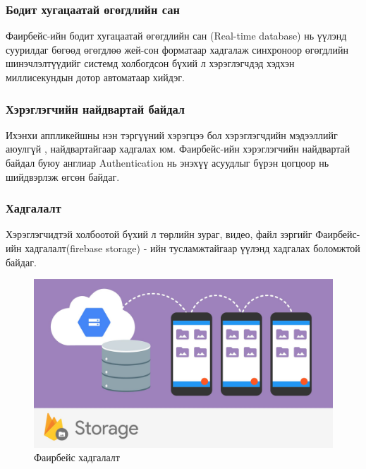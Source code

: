 \subsubsection{Бодит хугацаатай өгөгдлийн сан}
Фаирбейс-ийн бодит хугацаатай өгөгдлийн сан (Real-time database) нь үүлэнд суурилдаг бөгөөд өгөгдлөө жей-сон форматаар хадгалаж синхроноор өгөгдлийн шинэчлэлтүүдийг системд холбогдсон бүхий л хэрэглэгчдэд хэдхэн миллисекундын дотор автоматаар хийдэг. 

\subsubsection{Хэрэглэгчийн найдвартай байдал}
Ихэнхи аппликейшны нэн тэргүүний хэрэгцээ бол хэрэглэгчдийн мэдээллийг аюулгүй , найдвартайгаар хадгалах юм. Фаирбейс-ийн хэрэглэгчийн найдвартай байдал буюу англиар Authentication нь энэхүү асуудлыг бүрэн цогцоор нь шийдвэрлэж өгсөн байдаг.

\subsubsection{Хадгалалт}
Хэрэглэгчидтэй холбоотой бүхий л төрлийн зураг, видео, файл зэргийг Фаирбейс-ийн хадгалалт(firebase storage) - ийн тусламжтайгаар үүлэнд хадгалах боломжтой байдаг. 

\begin{figure}[H]
	\centering
	\includegraphics[width=\textwidth]{Figures/sudalgaa/firebaseStorage.jpg}
	\caption{Фаирбейс хадгалалт}
	\label{figure:storage}
\end{figure}

